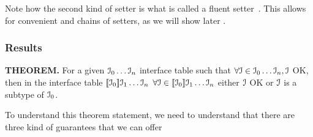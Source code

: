 Note how the second kind of setter is what is called a fluent setter~\cite{the lombock thread, something about fluent stuff}.
This allows for convenient and chains of setters, as we will show later .




\subsubsection{Results}
\textbf{THEOREM. } 
For a given ${\cal{I}}_0\ldots{\cal{I}}_n$ interface table such that
$\forall{\cal{I}}\in{\cal{I}}_0\ldots{\cal{I}}_n, {\cal{I}}$ OK, then in the interface table
$[\![{\cal{I}}_0]\!]{\cal{I}}_1\ldots{\cal{I}}_n$
$\forall{\cal{I}}\in[\![{\cal{I}}_0]\!]{\cal{I}}_1\ldots{\cal{I}}_n$ either ${\cal{I}}$ OK or ${\cal{I}}$ is a subtype of ${\cal{I}}_0$.

To understand this theorem statement, we need to understand that there are three kind of guarantees that we can offer







